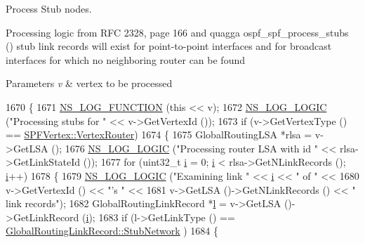 Process Stub nodes. 

Processing logic from R\+FC 2328, page 166 and quagga ospf\+\_\+spf\+\_\+process\+\_\+stubs () stub link records will exist for point-\/to-\/point interfaces and for broadcast interfaces for which no neighboring router can be found


\begin{DoxyParams}{Parameters}
{\em v} & vertex to be processed \\
\hline
\end{DoxyParams}

\begin{DoxyCode}
1670 \{
1671   \hyperlink{log-macros-disabled_8h_a90b90d5bad1f39cb1b64923ea94c0761}{NS\_LOG\_FUNCTION} (\textcolor{keyword}{this} << v);
1672   \hyperlink{group__logging_ga88acd260151caf2db9c0fc84997f45ce}{NS\_LOG\_LOGIC} (\textcolor{stringliteral}{"Processing stubs for "} << v->GetVertexId ());
1673   \textcolor{keywordflow}{if} (v->GetVertexType () == \hyperlink{classns3_1_1SPFVertex_a20f8a4cfc99a1b7ecd10a23151b93afda340822983a2833fff14de88ea20a3f31}{SPFVertex::VertexRouter})
1674     \{
1675       GlobalRoutingLSA *rlsa = v->GetLSA ();
1676       \hyperlink{group__logging_ga88acd260151caf2db9c0fc84997f45ce}{NS\_LOG\_LOGIC} (\textcolor{stringliteral}{"Processing router LSA with id "} << rlsa->GetLinkStateId ());
1677       \textcolor{keywordflow}{for} (uint32\_t \hyperlink{bernuolliDistribution_8m_a6f6ccfcf58b31cb6412107d9d5281426}{i} = 0; \hyperlink{bernuolliDistribution_8m_a6f6ccfcf58b31cb6412107d9d5281426}{i} < rlsa->GetNLinkRecords (); \hyperlink{bernuolliDistribution_8m_a6f6ccfcf58b31cb6412107d9d5281426}{i}++)
1678         \{
1679           \hyperlink{group__logging_ga88acd260151caf2db9c0fc84997f45ce}{NS\_LOG\_LOGIC} (\textcolor{stringliteral}{"Examining link "} << \hyperlink{bernuolliDistribution_8m_a6f6ccfcf58b31cb6412107d9d5281426}{i} << \textcolor{stringliteral}{" of "} << 
1680                         v->GetVertexId () << \textcolor{stringliteral}{"'s "} <<
1681                         v->GetLSA ()->GetNLinkRecords () << \textcolor{stringliteral}{" link records"});
1682           GlobalRoutingLinkRecord *\hyperlink{buildings__pathloss_8m_a5b54c0a045f179bcbbbc9abcb8b5cd4c}{l} = v->GetLSA ()->GetLinkRecord (\hyperlink{bernuolliDistribution_8m_a6f6ccfcf58b31cb6412107d9d5281426}{i});
1683           \textcolor{keywordflow}{if} (l->GetLinkType () == \hyperlink{classns3_1_1GlobalRoutingLinkRecord_a9380bcce9bca03943c4761b166a694f4a183ff8c880e05253fdca7bece2cad90b}{GlobalRoutingLinkRecord::StubNetwork}
      )
1684             \{

\end{DoxyCode}
